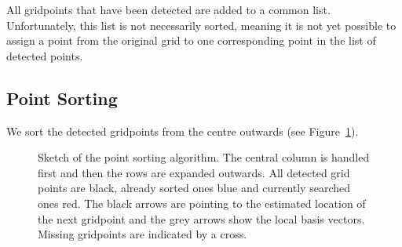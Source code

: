 %
All gridpoints that have been detected are added to a common list. Unfortunately, this list is not necessarily sorted, meaning it is not yet possible to assign a point from the original grid to one corresponding point in the list of detected points. 

\subsection*{Point Sorting}
We sort the detected gridpoints from the centre outwards (see Figure~\ref{fig:sorting_tikz}). 
\begin{figure}[htbp]
    \centering
    
    \caption[Sketch of the point sorting algorithm]{Sketch of the point sorting algorithm. The central column is handled first and then the rows are expanded outwards. All detected grid points are black, already sorted ones blue and currently searched ones red. The black arrows are pointing to the estimated location of the next gridpoint and the grey arrows show the local basis vectors. Missing gridpoints are indicated by a cross.}  
    \label{fig:sorting_tikz}
\end{figure}
